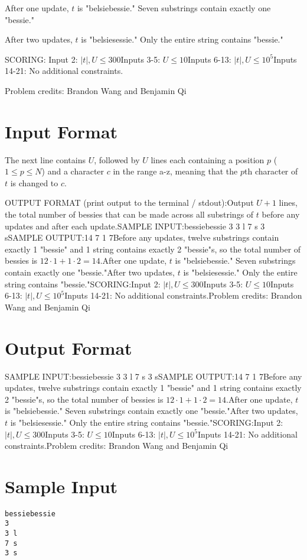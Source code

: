 \documentclass[12pt]{article}
\begin{document}
After one update, $t$ is "belsiebessie." Seven substrings contain exactly one
"bessie."

After two updates, $t$ is "belsiesessie." Only the entire string contains
"bessie."

SCORING:
Input 2: $|t|, U\le 300$Inputs 3-5: $U\le 10$Inputs 6-13: $|t|, U\le 10^5$Inputs 14-21: No additional constraints.


Problem credits: Brandon Wang and Benjamin Qi



\section*{Input Format}
The next line contains $U$, followed by $U$ lines each containing a position $p$
($1\le p\le N$) and a character $c$ in the range a-z, meaning that the $p$th
character of $t$ is changed to $c$.

OUTPUT FORMAT (print output to the terminal / stdout):Output $U+1$ lines, the total number of bessies that can be made across all
substrings of $t$ before any updates and after each update.SAMPLE INPUT:bessiebessie
3
3 l
7 s
3 sSAMPLE OUTPUT:14
7
1
7Before any updates, twelve substrings contain exactly 1 "bessie" and 1 string
contains exactly 2 "bessie"s, so the total number of bessies is
$12\cdot 1 + 1 \cdot 2 = 14$.After one update, $t$ is "belsiebessie." Seven substrings contain exactly one
"bessie."After two updates, $t$ is "belsiesessie." Only the entire string contains
"bessie."SCORING:Input 2: $|t|, U\le 300$Inputs 3-5: $U\le 10$Inputs 6-13: $|t|, U\le 10^5$Inputs 14-21: No additional constraints.Problem credits: Brandon Wang and Benjamin Qi

\section*{Output Format}
SAMPLE INPUT:bessiebessie
3
3 l
7 s
3 sSAMPLE OUTPUT:14
7
1
7Before any updates, twelve substrings contain exactly 1 "bessie" and 1 string
contains exactly 2 "bessie"s, so the total number of bessies is
$12\cdot 1 + 1 \cdot 2 = 14$.After one update, $t$ is "belsiebessie." Seven substrings contain exactly one
"bessie."After two updates, $t$ is "belsiesessie." Only the entire string contains
"bessie."SCORING:Input 2: $|t|, U\le 300$Inputs 3-5: $U\le 10$Inputs 6-13: $|t|, U\le 10^5$Inputs 14-21: No additional constraints.Problem credits: Brandon Wang and Benjamin Qi

\section*{Sample Input}
\begin{verbatim}
bessiebessie
3
3 l
7 s
3 s
\end{verbatim}
\end{document}
